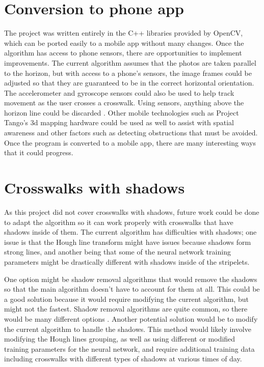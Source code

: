 \documentclass[12pt]{ucthesis}
\begin{document}
\section{Conversion to phone app}

The project was written entirely in the C++ libraries provided by OpenCV, which can be ported easily to a mobile app without many changes. Once the algorithm has access to phone sensors, there are opportunities to implement improvements. The current algorithm assumes that the photos are taken parallel to the horizon, but with access to a phone's sensors, the image frames could be adjusted so that they are guaranteed to be in the correct horizontal orientation. The accelerometer and gyroscope sensors could also be used to help track movement as the user crosses a crosswalk. Using sensors, anything above the horizon line could be discarded \cite{Crosswatch2Lane}. Other mobile technologies such as Project Tango's 3d mapping hardware \cite{projectTango} could be used as well to assist with spatial awareness and other factors such as detecting obstructions that must be avoided. Once the program is converted to a mobile app, there are many interesting ways that it could progress.

\section{Crosswalks with shadows}

As this project did not cover crosswalks with shadows, future work could be done to adapt the algorithm so it can work properly with crosswalks that have shadows inside of them. The current algorithm has difficulties with shadows; one issue is that the Hough line transform might have issues because shadows form strong lines, and another being that some of the neural network training parameters might be drastically different with shadows inside of the stripelets. 

One option might be shadow removal algorithms that would remove the shadows so that the main algorithm doesn't have to account for them at all. This could be a good solution because it would require modifying the current algorithm, but might not the fastest. Shadow removal algorithms are quite common, so there would be many different options \cite{shadowRemoval}. Another potential solution would be to modify the current algorithm to handle the shadows. This method would likely involve modifying the Hough lines grouping, as well as using different or modified training parameters for the neural network, and require additional training data including crosswalks with different types of shadows at various times of day. 
\end{document}
